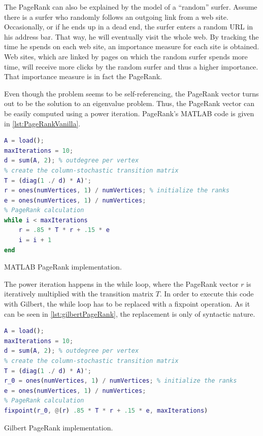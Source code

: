 The PageRank can also be explained by the model of a ``random'' surfer.
Assume there is a surfer who randomly follows an outgoing link from a web site.
Occasionally, or if he ends up in a dead end, the surfer enters a random URL in his address bar.
That way, he will eventually visit the whole web.
By tracking the time he spends on each web site, an importance measure for each site is obtained.
Web sites, which are linked by pages on which the random surfer spends more time, will receive more clicks by the random surfer and thus a higher importance.
That importance measure is in fact the PageRank.

Even though the problem seems to be self-referencing, the PageRank vector turns out to be the solution to an eigenvalue problem.
Thus, the PageRank vector can be easily computed using a power iteration.
PageRank's MATLAB code is given in \cref{lst:PageRankVanilla}.

\begin{listing}[!h]
	\begin{CenteredBox}
		\begin{lstlisting}[language=Matlab,
		commentstyle=\color{black},
		  stringstyle=\color{black},
		  keywordstyle=\color{black}\bfseries,
		  morekeywords={ones},]
% load adjacency matrix
A = load(); 
maxIterations = 10;
d = sum(A, 2); % outdegree per vertex
% create the column-stochastic transition matrix
T = (diag(1 ./ d) * A)'; 
r = ones(numVertices, 1) / numVertices; % initialize the ranks
e = ones(numVertices, 1) / numVertices;
% PageRank calculation
while i < maxIterations
	r = .85 * T * r + .15 * e
	i = i + 1
end
		\end{lstlisting}
	\end{CenteredBox}
	\caption{MATLAB PageRank implementation.}
	\label{lst:PageRankVanilla}
\end{listing}

The power iteration happens in the while loop, where the PageRank vector $r$ is iteratively multiplied with the transition matrix $T$.
In order to execute this code with Gilbert, the while loop has to be replaced with a fixpoint operation.
As it can be seen in \cref{lst:gilbertPageRank}, the replacement is only of syntactic nature.

\begin{listing}[!h]
	\begin{CenteredBox}
		\begin{lstlisting}[language=Matlab,
		commentstyle=\color{black},
		  stringstyle=\color{black},
		  keywordstyle=\color{black}\bfseries,
		  morekeywords={ones, fixpoint},]
% load adjacency matrix
A = load();
maxIterations = 10;
d = sum(A, 2); % outdegree per vertex
% create the column-stochastic transition matrix
T = (diag(1 ./ d) * A)'; 
r_0 = ones(numVertices, 1) / numVertices; % initialize the ranks
e = ones(numVertices, 1) / numVertices;
% PageRank calculation
fixpoint(r_0, @(r) .85 * T * r + .15 * e, maxIterations)
		\end{lstlisting}
	\end{CenteredBox}
	\caption{Gilbert PageRank implementation.}
	\label{lst:gilbertPageRank}
\end{listing}

